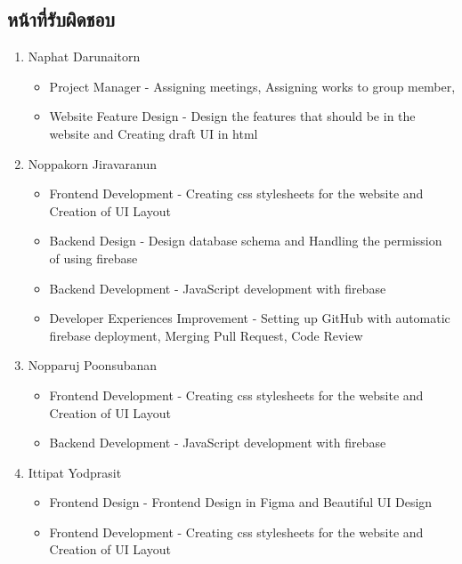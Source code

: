 \documentclass[17pt]{extarticle}
\begin{document}
\subsection{หน้าที่รับผิดชอบ}
\begin{enumerate}
    \item Naphat Darunaitorn
          \begin{itemize}
              \item Project Manager - Assigning meetings, Assigning works to group member,
              \item Website Feature Design - Design the features that should be in the website and Creating draft UI in html
          \end{itemize}
    \item Noppakorn Jiravaranun
          \begin{itemize}
              \item Frontend Development - Creating css stylesheets for the website and Creation of UI Layout
              \item Backend Design - Design database schema and Handling the permission of using firebase
              \item Backend Development - JavaScript development with firebase
              \item Developer Experiences Improvement - Setting up GitHub with automatic firebase deployment, Merging Pull Request, Code Review
          \end{itemize}
    \item Nopparuj Poonsubanan
          \begin{itemize}
              \item Frontend Development - Creating css stylesheets for the website and Creation of UI Layout
              \item Backend Development - JavaScript development with firebase
          \end{itemize}
    \item Ittipat Yodprasit
          \begin{itemize}
              \item Frontend Design - Frontend Design in Figma and Beautiful UI Design
              \item Frontend Development - Creating css stylesheets for the website and Creation of UI Layout
          \end{itemize}
\end{enumerate}
\end{document}
